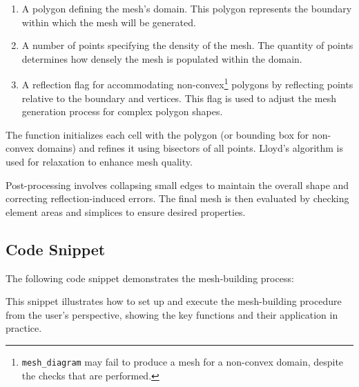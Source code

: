 \begin{enumerate}
    \item A polygon defining the mesh's domain. This polygon represents the boundary within which the mesh will be generated.
    \item A number of points specifying the density of the mesh. The quantity of points determines how densely the mesh is populated within the domain.
    \item A reflection flag for accommodating non-convex\footnote{\lstinline{mesh_diagram} may fail to produce a mesh for a non-convex domain, despite the checks that are performed.} polygons by reflecting points relative to the boundary and vertices. This flag is used to adjust the mesh generation process for complex polygon shapes.
\end{enumerate}

The function initializes each cell with the polygon (or bounding box for non-convex domains) and refines it using bisectors of all points. Lloyd's algorithm is used for relaxation to enhance mesh quality.

Post-processing involves collapsing small edges to maintain the overall shape and correcting reflection-induced errors. The final mesh is then evaluated by checking element areas and simplices to ensure desired properties.

\newpage
\subsection{Code Snippet}

The following code snippet demonstrates the mesh-building process:



This snippet illustrates how to set up and execute the mesh-building procedure from the user's perspective, showing the key functions and their application in practice.